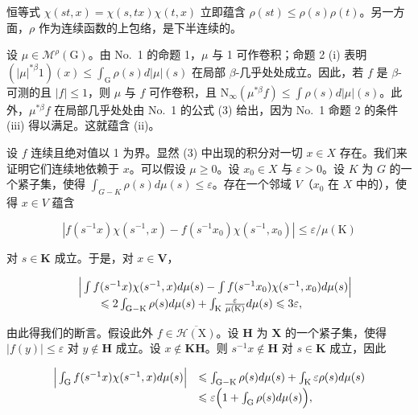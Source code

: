 恒等式 \(\chi(st,x) = \chi(s,tx)\chi(t,x)\) 立即蕴含 \(\rho(st) \leqslant \rho(s)\rho(t)\)。另一方面，\(\rho\) 作为连续函数的上包络，是下半连续的。

设 \(\mu \in \mathcal{M}^{\rho}(\mathrm{G})\)。由 No.~1 的命题 1，\(\mu\) 与 1 可作卷积；命题 2 (i) 表明 \((|\mu|^{*\beta}1)(x) \leqslant \int_{\mathrm{G}} \rho(s)d|\mu|(s)\) 在局部 \(\beta\)-几乎处处成立。因此，若 \(f\) 是 \(\beta\)-可测的且 \(|f| \leqslant 1\)，则 \(\mu\) 与 \(f\) 可作卷积，且 \(\mathrm{N}_{\infty}(\mu^{*\beta}f) \leqslant \int \rho(s)d|\mu|(s)\)。此外，\(\mu^{*\beta}f\) 在局部几乎处处由 No.~1 的公式 (3) 给出，因为 No.~1 命题 2 的条件 (iii) 得以满足。这就蕴含 (ii)。

设 \(f\) 连续且绝对值以 1 为界。显然 (3) 中出现的积分对一切 \(x \in X\) 存在。我们来证明它们连续地依赖于 \(x\)。可以假设 \(\mu \geqslant 0\)。设 \(x_0 \in X\) 与 \(\varepsilon > 0\)。设 \(K\) 为 \(G\) 的一个紧子集，使得 \(\int_{G - K} \rho(s) d\mu(s) \leqslant \varepsilon\)。存在一个邻域 \(V\)（\(x_0\) 在 \(X\) 中的），使得 \(x \in V\) 蕴含

\[
\left| f \left(s ^ {- 1} x\right) \chi \left(s ^ {- 1}, x\right) - f \left(s ^ {- 1} x _ {0}\right) \chi \left(s ^ {- 1}, x _ {0}\right) \right| \leqslant \varepsilon / \mu (\mathrm{K})
\]

对 \(s \in \mathbf{K}\) 成立。于是，对 \(x \in \mathbf{V}\)，

\[
\begin{array}{r l} & {\Big | \int f (s ^ {- 1} x) \chi (s ^ {- 1}, x) d \mu (s) - \int f (s ^ {- 1} x _ {0}) \chi (s ^ {- 1}, x _ {0}) d \mu (s) \Big |} \\ & {\qquad \leqslant 2 \int_ {\mathrm{G-K}} \rho (s) d \mu (s) + \int_ {\mathrm{K}} \frac {\varepsilon}{\mu (\mathrm{K})} d \mu (s) \leqslant 3 \varepsilon ,} \end{array}
\]

由此得我们的断言。假设此外 \(f \in \overline{\mathcal{H}(\mathrm{X})}\)。设 \(\mathbf{H}\) 为 \(\mathbf{X}\) 的一个紧子集，使得 \(|f(y)| \leqslant \varepsilon\) 对 \(y \notin \mathbf{H}\) 成立。设 \(x \notin \mathbf{KH}\)。则 \(s^{-1}x \notin \mathbf{H}\) 对 \(s \in \mathbf{K}\) 成立，因此

\[
\begin{array}{r l} \Big | \int_ {\mathrm{G}} f (s ^ {- 1} x) \chi (s ^ {- 1}, x) d \mu (s) \Big | & \leqslant \int_ {\mathrm{G} - \mathrm{K}} \rho (s) d \mu (s) + \int_ {\mathrm{K}} \varepsilon \rho (s) d \mu (s) \\ & \leqslant \varepsilon \Big (1 + \int_ {\mathrm{G}} \rho (s) d \mu (s) \Big), \end{array}
\]

